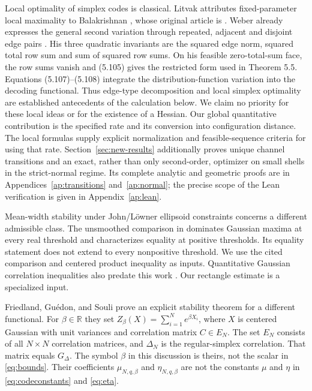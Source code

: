 \documentclass[11pt]{article}
\theoremstyle{remark}\newtheorem{remark}[theorem]{Remark}
\newcommand{\R}{\mathbb R}
\begin{document}
Local optimality of simplex codes is classical.
Litvak attributes fixed-parameter local maximality to Balakrishnan
\cite[Theorem 2.5]{Litvak}, whose original article is \cite{Balakrishnan}.
Weber already expresses the general second variation through repeated,
adjacent and disjoint edge pairs \cite[Lemma 5.8, equation (5.102)]{Weber}.
His three quadratic invariants are the squared edge norm, squared total row
sum and sum of squared row sums. On his feasible zero-total-sum face,
the row sums vanish and (5.105) gives the restricted form used in Theorem 5.5.
Equations (5.107)--(5.108) integrate the distribution-function variation into
the decoding functional. Thus edge-type decomposition and local simplex
optimality are established antecedents of the calculation below.
We claim no priority for these local ideas or for the existence of a Hessian.
Our global quantitative contribution is the specified rate and its
conversion into configuration distance. The local formulas supply explicit
normalization and feasible-sequence criteria for using that rate.
Section~\ref{sec:new-results} additionally proves unique channel transitions
and an exact, rather than only second-order, optimizer on small shells in
the strict-normal regime. Its complete analytic and geometric proofs are
in Appendices~\ref{ap:transitions} and~\ref{ap:normal}; the precise scope of
the Lean verification is given in Appendix~\ref{ap:lean}.

Mean-width stability under John/L\"owner ellipsoid constraints \cite{BFH}
concerns a different admissible class. The unsmoothed comparison in
\cite[Theorem 1.1]{MulgundFull} dominates Gaussian maxima at every real
threshold and characterizes equality at positive thresholds.
Its equality statement does not extend to every nonpositive threshold.
We use the cited comparison and centered product inequality as inputs.
Quantitative Gaussian correlation inequalities also predate this work
\cite{DNS}. Our rectangle estimate is a specialized input.

Friedland, Gu\'edon, and Souli \cite{FGS} prove an explicit stability theorem
for a different functional. For $\beta\in\R$ they set
$Z_\beta(X)=\sum_{i=1}^N e^{\beta X_i}$, where $X$ is centered Gaussian with
unit variances and correlation matrix $C\in E_N$. The set $E_N$ consists of
all $N\times N$ correlation matrices, and $\Delta_N$ is the regular-simplex
correlation. That matrix equals $G_\Delta$. The symbol $\beta$ in this
discussion is theirs, not the scalar in \eqref{eq:bounds}. Their coefficients
$\mu_{N,q,\beta}$ and $\eta_{N,q,\beta}$ are not the constants $\mu$ and
$\eta$ in \eqref{eq:codeconstants} and \eqref{eq:eta}.
\end{document}
